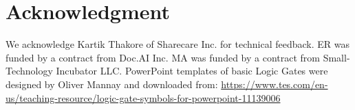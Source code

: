 \section*{Acknowledgment}
We acknowledge Kartik Thakore of Sharecare Inc. for technical feedback. ER was funded by a contract from Doc.AI Inc. MA was funded by a contract from Small-Technology Incubator LLC. PowerPoint templates of basic Logic Gates were designed by Oliver Mannay and downloaded from: \url{https://www.tes.com/en-us/teaching-resource/logic-gate-symbols-for-powerpoint-11139006}